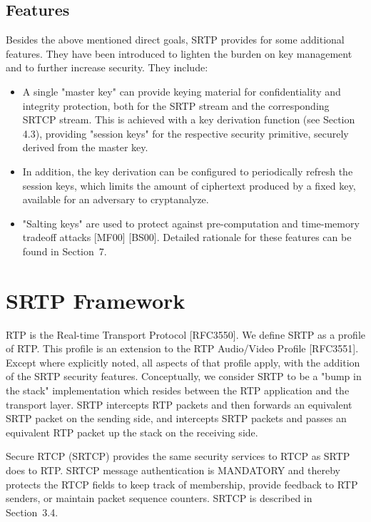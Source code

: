 \documentclass{article}
\begin{document}
\subsection{Features}

Besides the above mentioned direct goals, SRTP provides for some additional features.  They have been introduced to lighten the burden on key management and to further increase security.  They include:

\begin{itemize}
\item A single "master key" can provide keying material for confidentiality and integrity protection, both for the SRTP stream and the corresponding SRTCP stream.  This is achieved with a key derivation function (see Section 4.3), providing "session keys" for the respective security primitive, securely derived from the master key.
\item In addition, the key derivation can be configured to periodically refresh the session keys, which limits the amount of ciphertext produced by a fixed key, available for an adversary to cryptanalyze.
\item "Salting keys" are used to protect against pre-computation and time-memory tradeoff attacks [MF00] [BS00].
Detailed rationale for these features can be found in Section~7.

\end{itemize}
\section{SRTP Framework}

RTP is the Real-time Transport Protocol [RFC3550].  We define SRTP as a profile of RTP.  This profile is an extension to the RTP Audio/Video Profile [RFC3551].  Except where explicitly noted, all aspects of that profile apply, with the addition of the SRTP security features.  Conceptually, we consider SRTP to be a "bump in the stack" implementation which resides between the RTP application and the transport layer.  SRTP intercepts RTP packets and then forwards an equivalent SRTP packet on the sending side, and intercepts SRTP packets and passes an equivalent RTP packet up the stack on the receiving side.

Secure RTCP (SRTCP) provides the same security services to RTCP as SRTP does to RTP.  SRTCP message authentication is MANDATORY and thereby protects the RTCP fields to keep track of membership, provide feedback to RTP senders, or maintain packet sequence counters.  SRTCP is described in Section~3.4.
\end{document}
